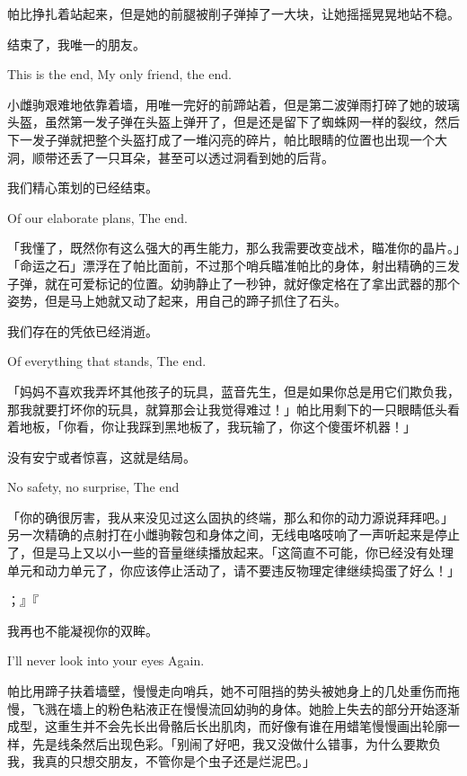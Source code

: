 帕比挣扎着站起来，但是她的前腿被削子弹掉了一大块，让她摇摇晃晃地站不稳。

\begin{song}
结束了，我唯一的朋友。

This is the end, My only friend, the end.
\end{song}

小雌驹艰难地依靠着墙，用唯一完好的前蹄站着，但是第二波弹雨打碎了她的玻璃头盔，虽然第一发子弹在头盔上弹开了，但是还是留下了蜘蛛网一样的裂纹，然后下一发子弹就把整个头盔打成了一堆闪亮的碎片，帕比眼睛的位置也出现一个大洞，顺带还丢了一只耳朵，甚至可以透过洞看到她的后背。

\begin{song}
我们精心策划的已经结束。

Of our elaborate plans, The end.
\end{song}

「我懂了，既然你有这么强大的再生能力，那么我需要改变战术，瞄准你的晶片。」「命运之石」漂浮在了帕比面前，不过那个哨兵瞄准帕比的身体，射出精确的三发子弹，就在可爱标记的位置。幼驹静止了一秒钟，就好像定格在了拿出武器的那个姿势，但是马上她就又动了起来，用自己的蹄子抓住了石头。

\begin{song}
我们存在的凭依已经消逝。

Of everything that stands, The end.
\end{song}

「妈妈不喜欢我弄坏其他孩子的玩具，蓝音先生，但是如果你总是用它们欺负我，那我就要打坏你的玩具，就算那会让我觉得难过！」帕比用剩下的一只眼睛低头看着地板，「你看，你让我踩到黑地板了，我玩输了，你这个傻蛋坏机器！」


\begin{song}
没有安宁或者惊喜，这就是结局。
    
No safety, no surprise, The end
\end{song}

「你的确很厉害，我从来没见过这么固执的终端，那么和你的动力源说拜拜吧。」另一次精确的点射打在小雌驹鞍包和身体之间，无线电咯吱响了一声听起来是停止了，但是马上又以小一些的音量继续播放起来。「这简直不可能，你已经没有处理单元和动力单元了，你应该停止活动了，请不要违反物理定律继续捣蛋了好么！」

；』『
\begin{song}
    我再也不能凝视你的双眸。
    
    I'll never look into your eyes Again.
\end{song}

帕比用蹄子扶着墙壁，慢慢走向哨兵，她不可阻挡的势头被她身上的几处重伤而拖慢，飞溅在墙上的粉色粘液正在慢慢流回幼驹的身体。她脸上失去的部分开始逐渐成型，这重生并不会先长出骨骼后长出肌肉，而好像有谁在用蜡笔慢慢画出轮廓一样，先是线条然后出现色彩。「别闹了好吧，我又没做什么错事，为什么要欺负我，我真的只想交朋友，不管你是个虫子还是烂泥巴。」

